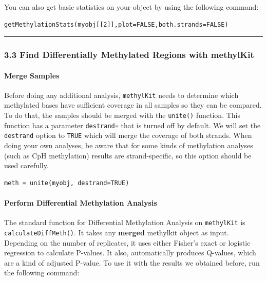 \documentclass[
]{book}
\begin{document}
You can also get basic statistics on your object by using the following command:

\begin{verbatim}
getMethylationStats(myobj[[2]],plot=FALSE,both.strands=FALSE)
\end{verbatim}

\begin{center}\rule{0.5\linewidth}{0.5pt}\end{center}

\subsubsection{3.3 Find Differentially Methylated Regions with methylKit}\label{find-differentially-methylated-regions-with-methylkit}

\paragraph{Merge Samples}\label{merge-samples}

Before doing any additional analysis, \texttt{methylKit} needs to determine which methylated bases have sufficient coverage in all samples so they can be compared. To do that, the samples should be merged with the \texttt{unite()} function. This function has a parameter \texttt{destrand=} that is turned off by default. We will set the \texttt{destrand} option to \texttt{TRUE} which will merge the coverage of both strands. When doing your own analyses, be aware that for some kinds of methylation analyses (such as CpH methylation) results are strand-specific, so this option should be used carefully.

\begin{verbatim}
meth = unite(myobj, destrand=TRUE)
\end{verbatim}

\paragraph{Perform Differential Methylation Analysis}\label{perform-differential-methylation-analysis}

The standard function for Differential Methylation Analysis on \texttt{methylKit} is \texttt{calculateDiffMeth()}. It takes any \textbf{merged} methylkit object as input. Depending on the number of replicates, it uses either Fisher's exact or logistic regression to calculate P-values. It also, automatically produces Q-values, which are a kind of adjusted P-value. To use it with the results we obtained before, run the following command:
\end{document}
